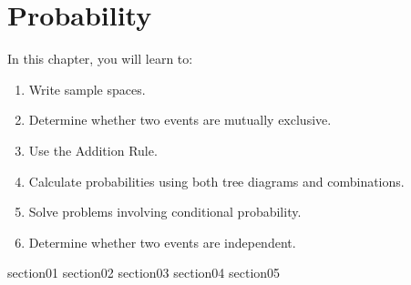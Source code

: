 \chapter{Probability}

In this chapter, you will learn to:
\begin{enumerate}
    \item Write sample spaces.
    \item Determine whether two events are mutually exclusive.
    \item Use the Addition Rule.
    \item Calculate probabilities using both tree diagrams and combinations.
    \item Solve problems involving conditional probability.
    \item Determine whether two events are independent.
\end{enumerate}

{section01}
{section02}
{section03}
{section04}
{section05}